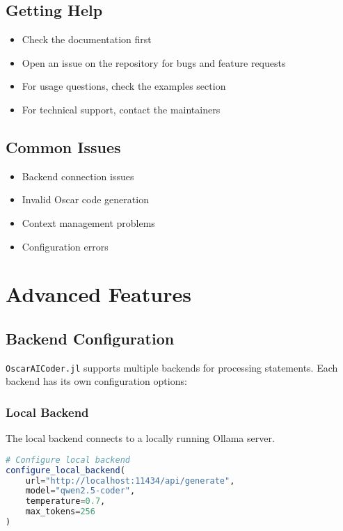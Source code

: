\documentclass[11pt,a4paper]{article}
\newcommand{\modname}[1]{\texttt{#1}}
\begin{document}
\subsection{Getting Help}
\begin{itemize}
    \item Check the documentation first
    \item Open an issue on the repository for bugs and feature requests
    \item For usage questions, check the examples section
    \item For technical support, contact the maintainers
\end{itemize}

\subsection{Common Issues}
\begin{itemize}
    \item Backend connection issues
    \item Invalid Oscar code generation
    \item Context management problems
    \item Configuration errors
\end{itemize}

\printindex

\section{Advanced Features}
\label{sec:advanced-features}

\subsection{Backend Configuration}
\label{subsec:backend_config}

\modname{OscarAICoder.jl} supports multiple backends for processing statements. Each backend has its own configuration options:

\subsubsection{Local Backend}
The local backend connects to a locally running Ollama server.

\begin{lstlisting}[language=Julia]
# Configure local backend
configure_local_backend(
    url="http://localhost:11434/api/generate",
    model="qwen2.5-coder",
    temperature=0.7,
    max_tokens=256
)
\end{lstlisting}
\end{document}
